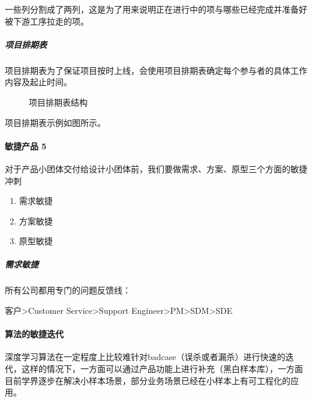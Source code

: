 \documentclass[letterpaper,11pt,english]{sphinxmanual}
\begin{document}
一些列分割成了两列，这是为了用来说明正在进行中的项与哪些已经完成并准备好被下游工序拉走的项。


\subparagraph{项目排期表}
\label{\detokenize{chapter_project/Scrum:id17}}
项目排期表为了保证项目按时上线，会使用项目排期表确定每个参与者的具体工作内容及起止时间。

\begin{figure}[H]
\centering
\capstart

\noindent{}
\caption{项目排期表结构}\label{\detokenize{chapter_project/Scrum:id23}}\end{figure}

项目排期表示例如图所示。

\begin{center}\end{center}  


\paragraph{敏捷产品 5\sphinxfootnotemark[744]}
\label{\detokenize{chapter_project/Scrum:id18}}%
\begin{footnotetext}[744]\sphinxAtStartFootnote
{}
%
\end{footnotetext}\ignorespaces 
对于产品小团体交付给设计小团体前，我们要做需求、方案、原型三个方面的敏捷冲刺
\begin{enumerate}
%
\item {} 
需求敏捷

\item {} 
方案敏捷

\item {} 
原型敏捷

\end{enumerate}


\subparagraph{需求敏捷}
\label{\detokenize{chapter_project/Scrum:id19}}
所有公司都用专门的问题反馈线：

客户\sphinxhyphen{}>Customer Service\sphinxhyphen{}>Support Engineer\sphinxhyphen{}>PM\sphinxhyphen{}>SDM\sphinxhyphen{}>SDE


\paragraph{算法的敏捷迭代}
\label{\detokenize{chapter_project/Scrum:id20}}
深度学习算法在一定程度上比较难针对badcase（误杀或者漏杀）进行快速的迭代，这样的情况下，一方面可以通过产品功能上进行补充（黑白样本库），一方面目前学界逐步在解决小样本场景，部分业务场景已经在小样本上有可工程化的应用。
\end{document}
